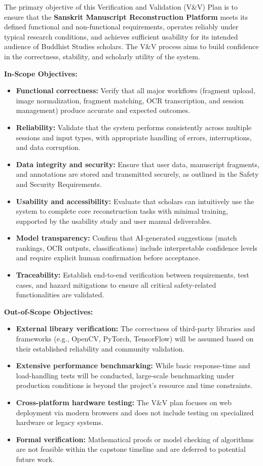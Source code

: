 \documentclass[12pt, titlepage]{article}
\begin{document}
The primary objective of this Verification and Validation (V\&V) Plan is to ensure that the \textbf{Sanskrit Manuscript Reconstruction Platform} meets its defined functional and non-functional requirements, operates reliably under typical research conditions, and achieves sufficient usability for its intended audience of Buddhist Studies scholars. The V\&V process aims to build confidence in the correctness, stability, and scholarly utility of the system.

\textbf{In-Scope Objectives:}
\begin{itemize}
    \item \textbf{Functional correctness:} Verify that all major workflows (fragment upload, image normalization, fragment matching, OCR transcription, and session management) produce accurate and expected outcomes.
    \item \textbf{Reliability:} Validate that the system performs consistently across multiple sessions and input types, with appropriate handling of errors, interruptions, and data corruption.
    \item \textbf{Data integrity and security:} Ensure that user data, manuscript fragments, and annotations are stored and transmitted securely, as outlined in the Safety and Security Requirements.
    \item \textbf{Usability and accessibility:} Evaluate that scholars can intuitively use the system to complete core reconstruction tasks with minimal training, supported by the usability study and user manual deliverables.
    \item \textbf{Model transparency:} Confirm that AI-generated suggestions (match rankings, OCR outputs, classifications) include interpretable confidence levels and require explicit human confirmation before acceptance.
    \item \textbf{Traceability:} Establish end-to-end verification between requirements, test cases, and hazard mitigations to ensure all critical safety-related functionalities are validated.
\end{itemize}

\textbf{Out-of-Scope Objectives:}
\begin{itemize}
    \item \textbf{External library verification:} The correctness of third-party libraries and frameworks (e.g., OpenCV, PyTorch, TensorFlow) will be assumed based on their established reliability and community validation.
    \item \textbf{Extensive performance benchmarking:} While basic response-time and load-handling tests will be conducted, large-scale benchmarking under production conditions is beyond the project’s resource and time constraints.
    \item \textbf{Cross-platform hardware testing:} The V\&V plan focuses on web deployment via modern browsers and does not include testing on specialized hardware or legacy systems.
    \item \textbf{Formal verification:} Mathematical proofs or model checking of algorithms are not feasible within the capstone timeline and are deferred to potential future work.
\end{itemize}
\end{document}
